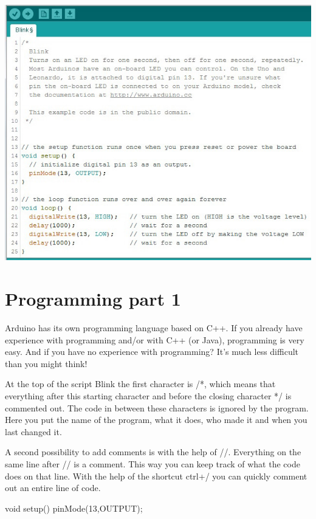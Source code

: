 \documentclass{arduino}
\begin{document}
\newpage

\begin{widebox}
    \begin{leftrightbox}[0.4]{\includegraphics[width=\linewidth]{12. Arduino code}}
    \section{Programming part 1}

    Arduino has its own programming language based on C++. If you already have experience with programming and/or with C++ (or Java), programming is very easy. And if you have no experience with programming? It's much less difficult than you might think!

    At the top of the script Blink the first character is /*, which means that everything after this starting character and before the closing character */ is commented out. The code in between these characters is ignored by the program. Here you put the name of the program, what it does, who made it and when you last changed it.
    \end{leftrightbox}
\end{widebox}

\smallskip

A second possibility to add comments is with the help of //. Everything on the same line after // is a comment. This way you can keep track of what the code does on that line. With the help of the shortcut ctrl+/ you can quickly comment out an entire line of code.
\begin{marginlisting}
void setup(){
  pinMode(13,OUTPUT);
}
\end{marginlisting}
\end{document}
